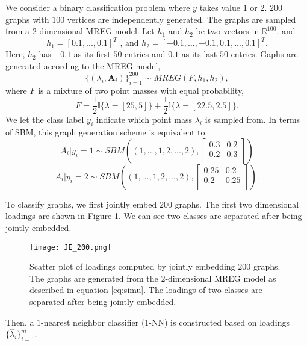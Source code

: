 \documentclass[10pt,journal,compsoc]{IEEEtran}
\newcommand{\bA}{\mathbf{A}}
\begin{document}
\noindent We consider a binary classification problem where $y$ takes value $1$ or $2$. $200$ graphs with $100$ vertices are independently generated. The graphs are sampled from a $2$-dimensional MREG model. Let $h_1$ and $h_2$ be two vectors in $\mathbb{R}^{100}$, and \[h_1=[0.1,...,0.1]^T \text{ , and } h_2=[-0.1,...,-0.1,0.1,...,0.1]^T. \] 
Here, $h_2$ has $-0.1$ as its first $50$ entries and $0.1$ as its last $50$ entries. Gaphs are generated according to the MREG model, 
\begin{equation}
\{(\lambda_i,\bA_i)\}_{i=1}^{200} \sim MREG(F,h_1,h_2),
\label{eq:simu}
\end{equation}
where $F$ is a mixture of two point masses with equal probability, 
\[ F = \frac{1}{2}\mathbb{I} \{\lambda=[25,5]\} + \frac{1}{2}\mathbb{I} \{\lambda=[22.5,2.5]\}.\]
We let the class label $y_i$ indicate which point mass $\lambda_i$ is sampled from. In terms of SBM, this graph generation scheme is equivalent to 
\[ A_i|y_i=1 \sim  SBM((1,...,1,2,...,2),\begin{bmatrix} 0.3 & 0.2 \\ 0.2 & 0.3 \\ \end{bmatrix})  \]
\[ A_i|y_i=2 \sim  SBM((1,...,1,2,...,2),\begin{bmatrix} 0.25 & 0.2 \\ 0.2 & 0.25 \\ \end{bmatrix}).\]

\noindent To classify graphs, we first jointly embed $200$ graphs. The first two dimensional loadings are shown in Figure \ref{fig:load}. We can see two classes are separated after being jointly embedded. 
\begin{figure}[!htbp]
	\centering
	\texttt{[image: JE\_200.png]}
	\caption{Scatter plot of loadings computed by jointly embedding $200$ graphs. The graphs are generated from the $2$-dimensional MREG model as described in equation \eqref{eq:simu}. The loadings of two classes are separated after being jointly embedded. }
	\label{fig:load}
\end{figure}
Then, a $1$-nearest neighbor classifier (1-NN) is constructed based on loadings $\{\hat{\lambda}_i\}_{i=1}^m$.\\
\end{document}
